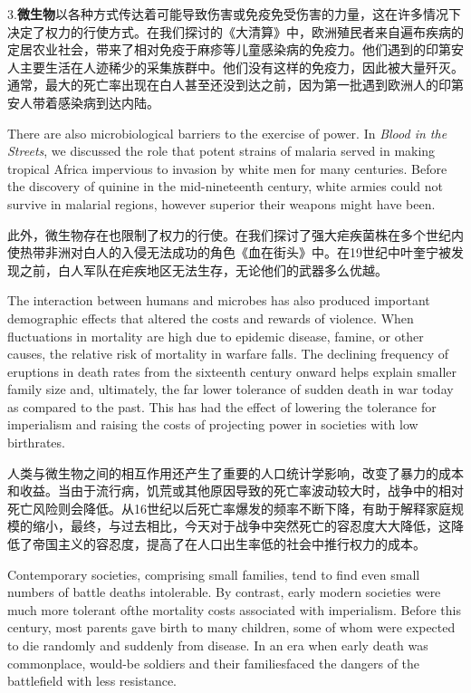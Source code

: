 \begin{Parallel}{97mm}{45mm}
  \ParallelRText
  {3.\textbf{微生物}以各种方式传达着可能导致伤害或免疫免受伤害的力量，这在许多情况下决定了权力的行使方式。在我们探讨的《大清算》中，欧洲殖民者来自遍布疾病的定居农业社会，带来了相对免疫于麻疹等儿童感染病的免疫力。他们遇到的印第安人主要生活在人迹稀少的采集族群中。他们没有这样的免疫力，因此被大量歼灭。通常，最大的死亡率出现在白人甚至还没到达之前，因为第一批遇到欧洲人的印第安人带着感染病到达内陆。}
  \ParallelPar



  \ParallelLText
  {There are also microbiological barriers to the exercise of power. In \emph{Blood in the Streets}, we discussed the role that potent strains of malaria served in making tropical Africa impervious to invasion by white men for many centuries. Before the discovery of quinine in the mid-nineteenth century, white armies could not survive in malarial regions, however superior their weapons might have been.}
  
  \ParallelRText
  {此外，微生物存在也限制了权力的行使。在我们探讨了强大疟疾菌株在多个世纪内使热带非洲对白人的入侵无法成功的角色《血在街头》中。在19世纪中叶奎宁被发现之前，白人军队在疟疾地区无法生存，无论他们的武器多么优越。}
  \ParallelPar



  \ParallelLText
  {The interaction between humans and microbes has also produced important demographic effects that altered the costs and rewards of violence. When fluctuations in mortality are high due to epidemic disease, famine, or other causes, the relative risk of mortality in warfare falls. The declining frequency of eruptions in death rates from the sixteenth century onward helps explain smaller family size and, ultimately, the far lower tolerance of sudden death in war today as compared to the past. This has had the effect of lowering the tolerance for imperialism and raising the costs of projecting power in societies with low birthrates.}
  
  \ParallelRText
  {人类与微生物之间的相互作用还产生了重要的人口统计学影响，改变了暴力的成本和收益。当由于流行病，饥荒或其他原因导致的死亡率波动较大时，战争中的相对死亡风险则会降低。从16世纪以后死亡率爆发的频率不断下降，有助于解释家庭规模的缩小，最终，与过去相比，今天对于战争中突然死亡的容忍度大大降低，这降低了帝国主义的容忍度，提高了在人口出生率低的社会中推行权力的成本。}
  \ParallelPar


  \ParallelLText
  {Contemporary societies, comprising small families, tend to find even small numbers of battle deaths intolerable. By contrast, early modern societies were much more tolerant ofthe mortality costs associated with imperialism. Before this century, most parents gave birth to many children, some of whom were expected to die randomly and suddenly from disease. In an era when early death was commonplace, would-be soldiers and their familiesfaced the dangers of the battlefield with less resistance.}
  

\end{Parallel}
